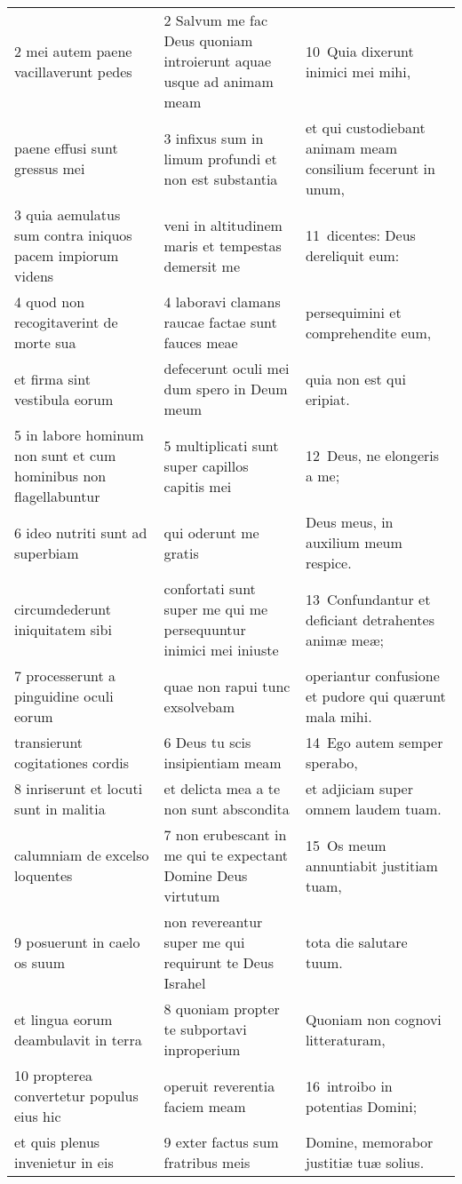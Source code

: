 \documentclass{article}
\begin{document}
\begin{longtable}{@{}p{}p{}p{}@{}}
2 mei autem paene vacillaverunt pedes	&	2 Salvum me fac Deus quoniam introierunt aquae usque ad animam meam	&	10 Quia dixerunt inimici mei mihi,	\\
paene effusi sunt gressus mei	&	3 infixus sum in limum profundi et non est substantia	&	et qui custodiebant animam meam consilium fecerunt in unum,	\\
3 quia aemulatus sum contra iniquos pacem impiorum videns	&	veni in altitudinem maris et tempestas demersit me	&	11 dicentes: Deus dereliquit eum:	\\
4 quod non recogitaverint de morte sua	&	4 laboravi clamans raucae factae sunt fauces meae	&	persequimini et comprehendite eum,	\\
et firma sint vestibula eorum	&	defecerunt oculi mei dum spero in Deum meum	&	quia non est qui eripiat.	\\
5 in labore hominum non sunt et cum hominibus non flagellabuntur	&	5 multiplicati sunt super capillos capitis mei	&	12 Deus, ne elongeris a me;	\\
6 ideo nutriti sunt ad superbiam	&	qui oderunt me gratis	&	Deus meus, in auxilium meum respice.	\\
circumdederunt iniquitatem sibi	&	confortati sunt super me qui me persequuntur inimici mei iniuste	&	13 Confundantur et deficiant detrahentes animæ meæ;	\\
7 processerunt a pinguidine oculi eorum	&	quae non rapui tunc exsolvebam	&	operiantur confusione et pudore qui quærunt mala mihi.	\\
transierunt cogitationes cordis	&	6 Deus tu scis insipientiam meam	&	14 Ego autem semper sperabo,	\\
8 inriserunt et locuti sunt in malitia	&	et delicta mea a te non sunt abscondita	&	et adjiciam super omnem laudem tuam.	\\
calumniam de excelso loquentes	&	7 non erubescant in me qui te expectant Domine Deus virtutum	&	15 Os meum annuntiabit justitiam tuam,	\\
9 posuerunt in caelo os suum	&	non revereantur super me qui requirunt te Deus Israhel	&	tota die salutare tuum.	\\
et lingua eorum deambulavit in terra	&	8 quoniam propter te subportavi inproperium	&	Quoniam non cognovi litteraturam,	\\
10 propterea convertetur populus eius hic	&	operuit reverentia faciem meam	&	16 introibo in potentias Domini;	\\
et quis plenus invenietur in eis	&	9 exter factus sum fratribus meis	&	Domine, memorabor justitiæ tuæ solius.	\\

\end{longtable}
\end{document}
